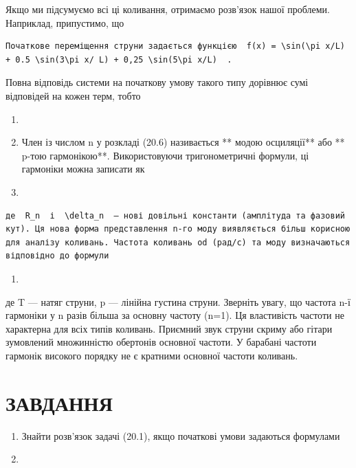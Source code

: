 \documentclass[
  ukrainian,
]{article}
\providecommand{\tightlist}{%
  \setlength{\itemsep}{0pt}\setlength{\parskip}{0pt}}
\begin{document}
Якщо ми підсумуємо всі ці коливання, отримаємо розв'язок нашої проблеми.
Наприклад, припустимо, що

\begin{verbatim}
Початкове переміщення струни задається функцією  f(x) = \sin(\pi x/L) + 0.5 \sin(3\pi x/ L) + 0,25 \sin(5\pi x/L)  .
\end{verbatim}

Повна відповідь системи на початкову умову такого типу дорівнює сумі
відповідей на кожен терм, тобто

\begin{enumerate}
\def\labelenumi{\arabic{enumi}.}
\setcounter{enumi}{17}
\item
\item
  Член із числом n у розкладі (20.6) називається ** модою осциляції**
  або ** p-тою гармонікою**. Використовуючи тригонометричні формули, ці
  гармоніки можна записати як
\item
\end{enumerate}

\begin{verbatim}
де  R_n  і  \delta_n  — нові довільні константи (амплітуда та фазовий кут). Ця нова форма представлення n-го моду виявляється більш корисною для аналізу коливань. Частота коливань od (рад/с) та моду визначаються відповідно до формули
\end{verbatim}

\begin{enumerate}
\def\labelenumi{\arabic{enumi}.}
\setcounter{enumi}{9}
\tightlist
\item
\end{enumerate}

де T --- натяг струни, p --- лінійна густина струни. Зверніть увагу, що
частота n-ї гармоніки у n разів більша за основну частоту (n=1). Ця
властивість частоти не характерна для всіх типів коливань. Приємний звук
струни скриму або гітари зумовлений множинністю обертонів основної
частоти. У барабані частоти гармонік високого порядку не є кратними
основної частоти коливань.

\section{ЗАВДАННЯ}\label{ux437ux430ux432ux434ux430ux43dux43dux44f}

\begin{enumerate}
\def\labelenumi{\arabic{enumi}.}
\item
  Знайти розв'язок задачі (20.1), якщо початкові умови задаються
  формулами
\item
\end{enumerate}
\end{document}
